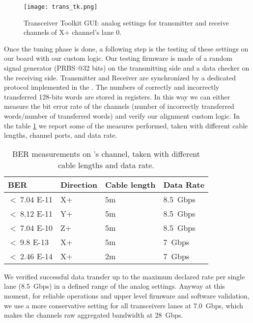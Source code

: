 \begin{figure}[!hbt]
  \centering
  \texttt{[image: trans\_tk.png]}
  \caption{Transceiver Toolkit GUI: analog settings for transmitter
  and receive channels of X+ channel's lane 0.}
  \label{fig:trans_tk}
\end{figure}

Once the tuning phase is done, a following step is the testing of
these settings on our board with our custom logic. Our testing
firmware is made of a random signal generator (PRBS @32 bits) on the
transmitting side and a data checker on the receiving side.
Transmitter and Receiver are synchronized by a dedicated protocol
implemented in the .
The numbers of correctly and incorrectly transferred 128-bits words
are stored in registers. In this way we can either measure the bit
error rate of the channels (number of incorrectly transferred
words/number of transferred words) and verify our alignment custom logic.
In the table \ref{tab:BER_table} we report some of the measures performed,
taken with different cable lengths, channel ports, and data rate.

\begin{table}[!t]
\renewcommand{\arraystretch}{1.3}
\centering
\begin{tabular}{|l||l|l|l|}
\hline
\hline
BER           & Direction & Cable length & Data Rate \\
\hline
$<~$7.04 E-11 & X+        & 5m           & 8.5~Gbps  \\
\hline
$<~$8.12 E-11 & Y+        & 5m           & 8.5~Gbps  \\
\hline
$<~$7.04 E-10 & Z+        & 5m           & 8.5~Gbps  \\
\hline
$<~$9.8 E-13  & X+        & 5m           & 7~Gbps    \\
\hline
$<~$2.46 E-14 & X+        & 2m           & 7~Gbps    \\
\hline
\hline
\end{tabular}
\caption{BER measurements on \apenetp's channel, taken with different 
cable lengths and data rate.}
\label{tab:BER_table}
\end{table}


We verified successful data transfer up to the maximum declared rate
per single lane (8.5~Gbps) in a defined range of the analog
settings. Anyway at this moment, for reliable operations and upper
level firmware and software validation, we use a more conservative
setting for all transceivers lanes at 7.0~Gbps, which makes the
channels raw aggregated bandwidth at 28~Gbps.

